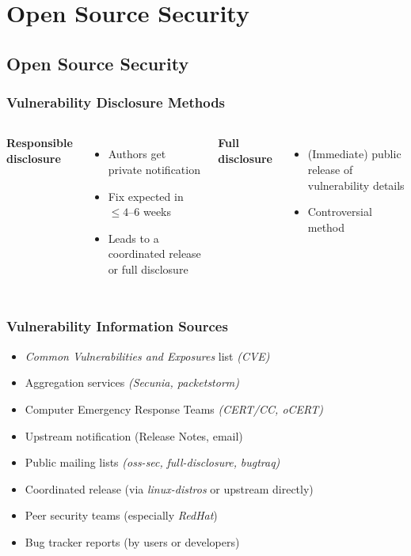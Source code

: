 \documentclass[svgnames]{beamer}
\begin{document}
\section{Open Source Security}
\subsection*{Open Source Security}

\begin{frame}
  \frametitle{Vulnerability Disclosure Methods}
  
  \begin{columns}[t]
    \begin{center}
      \textbf{Responsible disclosure}
    \end{center}
    
    \begin{itemize}
     \item Authors get private notification
     \item Fix expected in $\le 4$–6 weeks
     \item Leads to a coordinated release or full disclosure
    \end{itemize}  
    
    \pause
    
    \begin{center}
      \textbf{Full disclosure}
    \end{center}
    
    \begin{itemize}
     \item (Immediate) public release of vulnerability details
     \item Controversial method
    \end{itemize}
    
  \end{columns}

\end{frame}

\begin{frame}
  \frametitle{Vulnerability Information Sources}
  
  \begin{itemize}
    \item \emph{Common Vulnerabilities and Exposures} list \emph{(CVE)}
    \item Aggregation services \emph{(Secunia, packetstorm)}
    \item Computer Emergency Response Teams \emph{(CERT/CC, oCERT)}
    \item Upstream notification (Release Notes, email)
    \item Public mailing lists \emph{(oss-sec,} \emph{full-disclosure,} \emph{bugtraq)}
    \item Coordinated release (via \emph{linux-distros} or upstream directly)
    \item Peer security teams (especially \emph{RedHat})
    \item Bug tracker reports (by users or developers)
  \end{itemize}
\end{frame}
\end{document}

